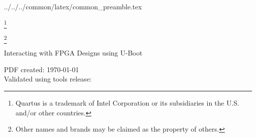 %
%
%
%
%

\newcommand{\repoTopPath}{../../..}
\newcommand{\commonPreamblePath}{\repoTopPath/common/latex/common_preamble.tex}
 \commonPreamblePath


\sffamily

\begin{center}
\let\savethefootnote\thefootnote
\let\thefootnote\relax\footnote{Quartus is a trademark of Intel Corporation or its subsidiaries in the U.S. and/or other countries.}
\addtocounter{footnote}{-1}
\let\thefootnote\savethefootnote
\hspace{-1em}
\let\savethefootnote\thefootnote
\let\thefootnote\relax\footnote{Other names and brands may be claimed as the property of others.}
\addtocounter{footnote}{-1}
\let\thefootnote\savethefootnote
\hspace{-1em}
\LARGE{Interacting with FPGA Designs using U-Boot}\\[1em]
\end{center}

\begin{flushleft}
\normalsize{PDF created: \today}\\
\normalsize{Validated using tools release: \TheToolsReleaseVersion}
\end{flushleft}


